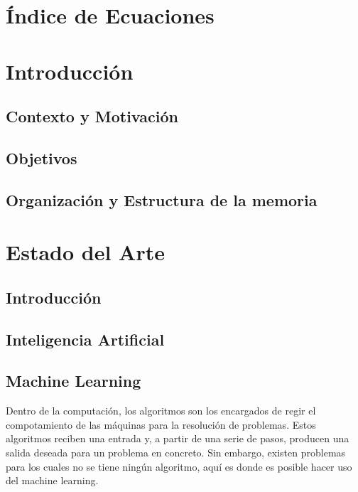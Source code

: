 \documentclass[a4paper,12pt]{article}
\begin{document}
\newpage

\section*{Índice de Ecuaciones}



\section{Introducción}

\subsection{Contexto y Motivación}

\subsection{Objetivos}

\subsection{Organización y Estructura de la memoria}



\section{Estado del Arte}

\subsection{Introducción}

\subsection{Inteligencia Artificial}

\subsection{Machine Learning}

Dentro de la computación, los algoritmos son los encargados
de regir el compotamiento de las máquinas para la resolución
de problemas. Estos algoritmos reciben una entrada y, a partir
de una serie de pasos, producen una salida deseada para un 
problema en concreto. Sin embargo, existen problemas para los 
cuales no se tiene ningún algoritmo, aquí es donde es posible 
hacer uso del machine learning.
\end{document}
